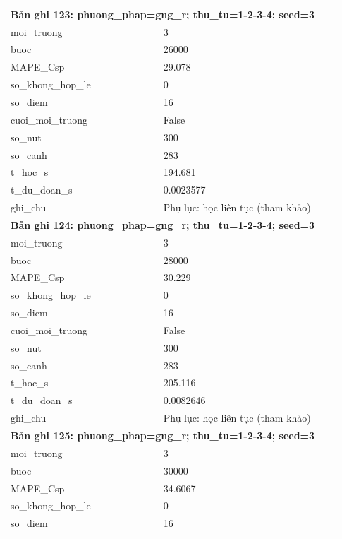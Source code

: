 \begin{longtable}{p{0.43\linewidth}p{0.50\linewidth}}
\midrule
\multicolumn{2}{p{0.95\linewidth}}{\textbf{Bản ghi 123: phuong\_phap=gng\_r; thu\_tu=1-2-3-4; seed=3}} \\
moi\_\allowbreak truong & 3 \\
buoc & 26000 \\
MAPE\_\allowbreak Csp & 29.078 \\
so\_\allowbreak khong\_\allowbreak hop\_\allowbreak le & 0 \\
so\_\allowbreak diem & 16 \\
cuoi\_\allowbreak moi\_\allowbreak truong & False \\
so\_\allowbreak nut & 300 \\
so\_\allowbreak canh & 283 \\
t\_\allowbreak hoc\_\allowbreak s & 194.681 \\
t\_\allowbreak du\_\allowbreak doan\_\allowbreak s & 0.0023577 \\
ghi\_\allowbreak chu & Phụ lục: học liên tục (tham khảo) \\
\midrule
\multicolumn{2}{p{0.95\linewidth}}{\textbf{Bản ghi 124: phuong\_phap=gng\_r; thu\_tu=1-2-3-4; seed=3}} \\
moi\_\allowbreak truong & 3 \\
buoc & 28000 \\
MAPE\_\allowbreak Csp & 30.229 \\
so\_\allowbreak khong\_\allowbreak hop\_\allowbreak le & 0 \\
so\_\allowbreak diem & 16 \\
cuoi\_\allowbreak moi\_\allowbreak truong & False \\
so\_\allowbreak nut & 300 \\
so\_\allowbreak canh & 283 \\
t\_\allowbreak hoc\_\allowbreak s & 205.116 \\
t\_\allowbreak du\_\allowbreak doan\_\allowbreak s & 0.0082646 \\
ghi\_\allowbreak chu & Phụ lục: học liên tục (tham khảo) \\
\midrule
\multicolumn{2}{p{0.95\linewidth}}{\textbf{Bản ghi 125: phuong\_phap=gng\_r; thu\_tu=1-2-3-4; seed=3}} \\
moi\_\allowbreak truong & 3 \\
buoc & 30000 \\
MAPE\_\allowbreak Csp & 34.6067 \\
so\_\allowbreak khong\_\allowbreak hop\_\allowbreak le & 0 \\
so\_\allowbreak diem & 16 \\

\end{longtable}
